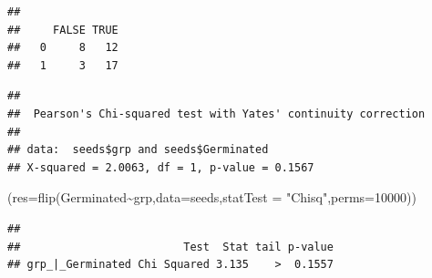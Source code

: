 \documentclass[
]{article}
\newenvironment{Shaded}{\begin{snugshade}}{\end{snugshade}}
\newcommand{\AttributeTok}[1]{\textcolor[rgb]{0.77,0.63,0.00}{#1}}
\newcommand{\DecValTok}[1]{\textcolor[rgb]{0.00,0.00,0.81}{#1}}
\newcommand{\FunctionTok}[1]{\textcolor[rgb]{0.00,0.00,0.00}{#1}}
\newcommand{\NormalTok}[1]{#1}
\newcommand{\OtherTok}[1]{\textcolor[rgb]{0.56,0.35,0.01}{#1}}
\newcommand{\SpecialCharTok}[1]{\textcolor[rgb]{0.00,0.00,0.00}{#1}}
\newcommand{\StringTok}[1]{\textcolor[rgb]{0.31,0.60,0.02}{#1}}
\begin{document}
\begin{Shaded}
\end{Shaded}

\begin{verbatim}
##    
##     FALSE TRUE
##   0     8   12
##   1     3   17
\end{verbatim}

\begin{Shaded}
\end{Shaded}

\begin{verbatim}
## 
##  Pearson's Chi-squared test with Yates' continuity correction
## 
## data:  seeds$grp and seeds$Germinated
## X-squared = 2.0063, df = 1, p-value = 0.1567
\end{verbatim}

\begin{Shaded}
\begin{Highlighting}[]
\NormalTok{(}\AttributeTok{res=}\FunctionTok{flip}\NormalTok{(Germinated}\SpecialCharTok{\textasciitilde{}}\NormalTok{grp,}\AttributeTok{data=}\NormalTok{seeds,}\AttributeTok{statTest =} \StringTok{"Chisq"}\NormalTok{,}\AttributeTok{perms=}\DecValTok{10000}\NormalTok{))}
\end{Highlighting}
\end{Shaded}

\begin{verbatim}
## 
##                         Test  Stat tail p-value
## grp_|_Germinated Chi Squared 3.135    >  0.1557
\end{verbatim}
\end{document}
